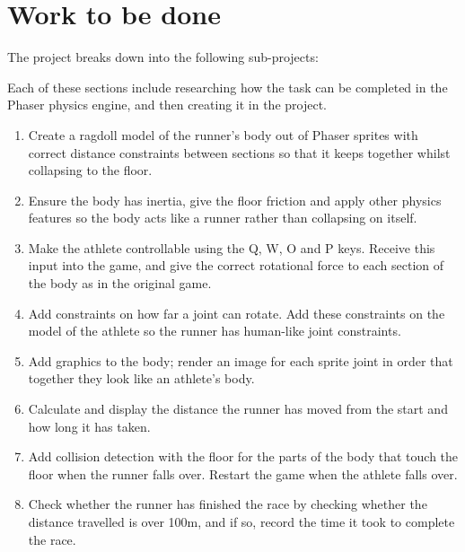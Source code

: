 \documentclass[12pt,a4paper,twoside]{article}
\begin{document}
\section*{Work to be done}


The project breaks down into the following sub-projects:

Each of these sections include researching how the task can be completed in the Phaser physics engine, and then creating it in the project.


 


\newcommand{\WorkA}{Create a ragdoll model of the runner's body out of Phaser sprites with correct distance constraints between sections so that it keeps together whilst collapsing to the floor. }
\newcommand{\WorkB}{Ensure the body has inertia, give the floor friction and apply other physics features so the body acts like a runner rather than collapsing on itself. }
\newcommand{\WorkC}{Make the athlete controllable using the Q, W, O and P keys. Receive this input into the game, and give the correct rotational force to each section of the body as in the original game. }
\newcommand{\WorkD}{Add constraints on how far a joint can rotate. Add these constraints on the model of the athlete so the runner has human-like joint constraints. }
\newcommand{\WorkE}{Add graphics to the body; render an image for each sprite joint in order that together they look like an athlete's body. }
\newcommand{\WorkF}{Calculate and display the distance the runner has moved from the start and how long it has taken. }
\newcommand{\WorkG}{Add collision detection with the floor for the parts of the body that touch the floor when the runner falls over. Restart the game when the athlete falls over. }
\newcommand{\WorkH}{Check whether the runner has finished the race by checking whether the distance travelled is over 100m, and if so, record the time it took to complete the race. }

\begin{enumerate}
\item \WorkA
\item \WorkB
\item \WorkC
\item \WorkD
\item \WorkE
\item \WorkF
\item \WorkG
\item \WorkH
\end{enumerate}
\end{document}
